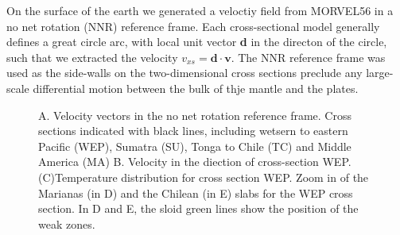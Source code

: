 \documentclass[12pt]{article}
\begin{document}
On the surface of the earth we generated a veloctiy field from MORVEL56 \citep{GGGE2060} in a no net rotation (NNR) reference frame. Each cross-sectional model generally defines a great circle arc, with local unit vector \textbf{d} in the directon of the circle, such that we extracted the velocity $v_{xs}=\textbf{d}\cdot\textbf{v}$.  The NNR reference frame was used as the side-walls on the two-dimensional cross sections preclude any large-scale differential motion between the bulk of thje mantle and the plates.

\begin{figure}[hbtp]
\centering
{}
\caption{A. Velocity vectors in the no net rotation reference frame. Cross sections indicated with black lines, including wetsern to eastern Pacific (WEP), Sumatra (SU), Tonga to Chile (TC) and Middle America (MA) B. Velocity in the diection of cross-section WEP.(C)Temperature distribution for cross section WEP. Zoom in of the Marianas (in D) and the Chilean (in E) slabs for the WEP cross section. In D and E, the sloid green lines show the position of the weak zones.}
\label{fig:xsection2sumatra}
\end{figure}
\end{document}
